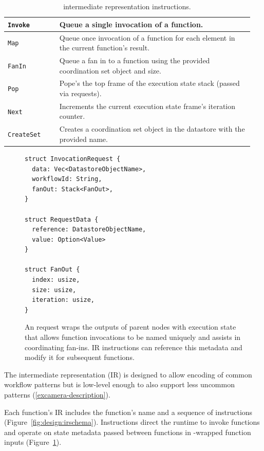 \begin{table}[t]
  \centering
  \begin{tabular}{|m{0.2\linewidth}|m{0.75\linewidth}|}
    \hline
  \texttt{Invoke} & Queue a single invocation of a function.\\
    \hline
  \texttt{Map} & Queue once invocation of a function for each element in the current function's result.\\
    \hline
  \texttt{FanIn} & Queue a fan in to a function using the provided coordination set object and size.\\
    \hline
  \texttt{Pop} & Pope's the top frame of the execution state stack (passed via \name{} requests). \\
    \hline
  \texttt{Next} & Increments the current execution state frame's iteration counter.\\
    \hline
  \texttt{CreateSet} & Creates a coordination set object in the datastore with the provided name.\\
    \hline
  \end{tabular}
  \caption{\name{} intermediate representation instructions.}
  \label{table:irschema}
\end{table}

\begin{figure}[t]
    \centering
    \begin{verbatim}
struct InvocationRequest {
  data: Vec<DatastoreObjectName>,
  workflowId: String,
  fanOut: Stack<FanOut>,
}

struct RequestData {
  reference: DatastoreObjectName,
  value: Option<Value>
}

struct FanOut {
  index: usize,
  size: usize,
  iteration: usize,
}
    \end{verbatim}
    \caption{An \name{} request wraps the outputs of parent nodes with execution
state that allows function invocations to be named uniquely and assists in
coordinating fan-ins. \name{} IR instructions can reference this metadata and
modify it for subsequent functions.}
    \label{fig:design:unum-request}
\end{figure}

The \name{} intermediate representation (IR) is designed to allow encoding of
common workflow patterns but is low-level enough to also support less uncommon
patterns (\ref{excamera-description}).

Each function's IR includes the function's name and a sequence of instructions
(Figure~\ref{fig:design:irschema}). Instructions direct the runtime to invoke
functions and operate on state metadata passed between functions in
\name{}-wrapped function inputs (Figure~\ref{fig:design:unum-request}).

